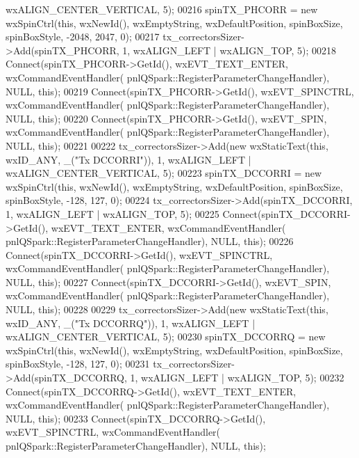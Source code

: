 \begin{DoxyCode}
      wxALIGN\_CENTER\_VERTICAL, 5);
00216     spinTX_PHCORR = \textcolor{keyword}{new} wxSpinCtrl(\textcolor{keyword}{this}, wxNewId(), wxEmptyString, wxDefaultPosition, spinBoxSize, 
      spinBoxStyle, -2048, 2047, 0);
00217     tx\_correctorsSizer->Add(spinTX_PHCORR, 1, wxALIGN\_LEFT | wxALIGN\_TOP, 5);
00218     Connect(spinTX_PHCORR->GetId(), wxEVT\_TEXT\_ENTER, wxCommandEventHandler(
      pnlQSpark::RegisterParameterChangeHandler), NULL, \textcolor{keyword}{this});
00219     Connect(spinTX_PHCORR->GetId(), wxEVT\_SPINCTRL, wxCommandEventHandler(
      pnlQSpark::RegisterParameterChangeHandler), NULL, \textcolor{keyword}{this});
00220     Connect(spinTX_PHCORR->GetId(), wxEVT\_SPIN, wxCommandEventHandler(
      pnlQSpark::RegisterParameterChangeHandler), NULL, \textcolor{keyword}{this});
00221 
00222     tx\_correctorsSizer->Add(\textcolor{keyword}{new} wxStaticText(\textcolor{keyword}{this}, wxID\_ANY, \_(\textcolor{stringliteral}{"Tx DCCORRI"})), 1, wxALIGN\_LEFT | 
      wxALIGN\_CENTER\_VERTICAL, 5);
00223     spinTX_DCCORRI = \textcolor{keyword}{new} wxSpinCtrl(\textcolor{keyword}{this}, wxNewId(), wxEmptyString, wxDefaultPosition, spinBoxSize, 
      spinBoxStyle, -128, 127, 0);
00224     tx\_correctorsSizer->Add(spinTX_DCCORRI, 1, wxALIGN\_LEFT | wxALIGN\_TOP, 5);
00225     Connect(spinTX_DCCORRI->GetId(), wxEVT\_TEXT\_ENTER, wxCommandEventHandler(
      pnlQSpark::RegisterParameterChangeHandler), NULL, \textcolor{keyword}{this});
00226     Connect(spinTX_DCCORRI->GetId(), wxEVT\_SPINCTRL, wxCommandEventHandler(
      pnlQSpark::RegisterParameterChangeHandler), NULL, \textcolor{keyword}{this});
00227     Connect(spinTX_DCCORRI->GetId(), wxEVT\_SPIN, wxCommandEventHandler(
      pnlQSpark::RegisterParameterChangeHandler), NULL, \textcolor{keyword}{this});
00228 
00229     tx\_correctorsSizer->Add(\textcolor{keyword}{new} wxStaticText(\textcolor{keyword}{this}, wxID\_ANY, \_(\textcolor{stringliteral}{"Tx DCCORRQ"})), 1, wxALIGN\_LEFT | 
      wxALIGN\_CENTER\_VERTICAL, 5);
00230     spinTX_DCCORRQ = \textcolor{keyword}{new} wxSpinCtrl(\textcolor{keyword}{this}, wxNewId(), wxEmptyString, wxDefaultPosition, spinBoxSize, 
      spinBoxStyle, -128, 127, 0);
00231     tx\_correctorsSizer->Add(spinTX_DCCORRQ, 1, wxALIGN\_LEFT | wxALIGN\_TOP, 5);
00232     Connect(spinTX_DCCORRQ->GetId(), wxEVT\_TEXT\_ENTER, wxCommandEventHandler(
      pnlQSpark::RegisterParameterChangeHandler), NULL, \textcolor{keyword}{this});
00233     Connect(spinTX_DCCORRQ->GetId(), wxEVT\_SPINCTRL, wxCommandEventHandler(
      pnlQSpark::RegisterParameterChangeHandler), NULL, \textcolor{keyword}{this});

\end{DoxyCode}
